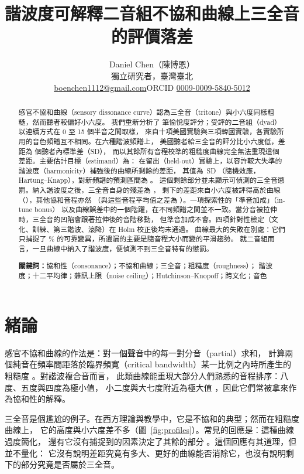 \documentclass[11pt,a4paper]{article}
\title{諧波度可解釋二音組不協和曲線上三全音的評價落差}
\author{Daniel Chen（陳博恩）\\[2pt]\normalsize 獨立研究者，臺灣臺北\\[2pt]
  \small \href{mailto:boenchen1112@gmail.com}{boenchen1112@gmail.com}\quad ORCID \href{https://orcid.org/0009-0009-5840-5012}{0009-0009-5840-5012}}
\date{}
\newcommand{\SDu}{\,SD}
\begin{document}
\maketitle

\begin{abstract}
\noindent
感官不協和曲線（sensory dissonance curve）認為三全音（tritone）與小六度同樣粗糙，然而聽者較偏好小六度。
我們重新分析了 \nAllTrials{} 筆愉悅度評分；受評的二音組（dyad）以連續方式在 0 至 15 個半音之間取樣，
來自十項美國實驗與三項韓國實驗，各實驗所用的音色頻譜互不相同。在六種諧波頻譜上，
美國聽者給三全音的評分比小六度低，差距為 \poolGapObsHarm{} 個聽者內標準差（SD），
而以其餘所有音程校準的粗糙度曲線完全無法重現這個差距。主要估計目標（estimand）為：
在留出（held-out）實驗上，以容許較大失準的諧波度（harmonicity）補強後的曲線所剩餘的差距，
其值為 \primGap\SDu{} \primGapCI{}（隨機效應，Hartung--Knapp），對新頻譜的預測區間為 \primGapPI。
這個剩餘部分並未顯示可偵測的三全音懲罰。納入諧波度之後，三全音自身的殘差為 \rpfSixTw，
剩下的差距來自小六度被評得高於曲線（\rpfEightTw），其他協和音程亦然
（與這些音程平均值之差為 \rpfMsixConsTw）。一項探索性的「準音加成」（in-tune bonus）
以及曲線誤差中的一個階躍，在不同頻譜之間並不一致。當分音被拉伸時，三全音的凹陷會跟著拉伸後的音階移動，
但準音加成不會。四項針對性檢定（文化、訓練、第三諧波、滾降）在 Holm 校正後均未通過。
曲線最大的失敗在別處：它們只捕捉了 \shBaseFrac\% 的可靠變異，所遺漏的主要是隨音程大小而變的平滑趨勢。
就二音組而言，一旦曲線中納入了諧波度，便偵測不到三全音特有的懲罰。

\medskip\noindent\textbf{關鍵詞：}協和性（consonance）；不協和曲線；三全音；粗糙度（roughness）；
諧波度；十二平均律；雜訊上限（noise ceiling）；Hutchinson--Knopoff；跨文化；音色
\end{abstract}

\section{緒論}

感官不協和曲線的作法是：對一個聲音中的每一對分音（partial）求和，
計算兩個純音在頻率間距落於臨界頻寬（critical bandwidth）某一比例之內時所產生的粗糙度
\citep{plomp1965,kameoka1969,hutchinson1978,sethares1993}。對諧波複合音而言，
此類曲線能重現大部分人們熟悉的音程排序：八度、五度與四度為極小值，
小二度與大七度附近為極大值 \citep{sethares2005}，因此它們常被拿來作為協和性的解釋。

三全音是個尷尬的例子。在西方理論與教學中，它是不協和的典型；然而在粗糙度曲線上，
它的高度與小六度差不多（圖~\ref{fig:profiles}）。常見的回應是：這種曲線過度簡化，
還有它沒有捕捉到的因素決定了其餘的部分
\citep{parncutt2011,harrison2020,lahdelma2022}。這個回應有其道理，但並不量化：
它沒有說明差距究竟有多大、更好的曲線能否消除它，也沒有說明剩下的部分究竟是否屬於三全音。
\end{document}
